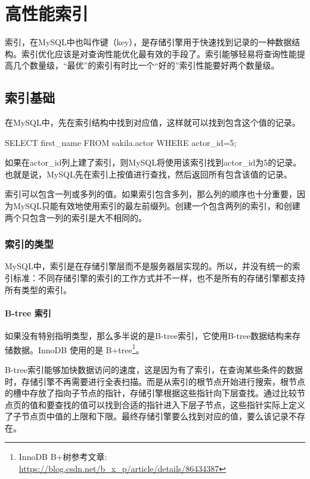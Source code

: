 \section{高性能索引}

索引，在MySQL中也叫作键（key），是存储引擎用于快速找到记录的一种数据结构。索引优化应该是对查询性能优化最有效的手段了。索引能够轻易将查询性能提高几个数量级，“最优”的索引有时比一个“好的”索引性能要好两个数量级。

\subsection{索引基础}

在MySQL中，先在索引结构中找到对应值，这样就可以找到包含这个值的记录。

\begin{sql}
SELECT first_name FROM sakila.actor WHERE actor_id=5;
\end{sql}

如果在actor\_id列上建了索引，则MySQL将使用该索引找到actor\_id为5的记录。也就是说，MySQL先在索引上按值进行查找，然后返回所有包含该值的记录。

索引可以包含一列或多列的值。如果索引包含多列，那么列的顺序也十分重要，因为MySQL只能有效地使用索引的最左前缀列。创建一个包含两列的索引，和创建两个只包含一列的索引是大不相同的。

\subsubsection{索引的类型}

MySQL中，索引是在存储引擎层而不是服务器层实现的。所以，并没有统一的索引标准：不同存储引擎的索引的工作方式并不一样，也不是所有的存储引擎都支持所有类型的索引。

\paragraph*{B-tree 索引}

如果没有特别指明类型，那么多半说的是B-tree索引，它使用B-tree数据结构来存储数据。InnoDB 使用的是 B+tree\footnote{InnoDB B+树参考文章: \url{https://blog.csdn.net/b_x_p/article/details/86434387}}。

B-tree索引能够加快数据访问的速度，这是因为有了索引，在查询某些条件的数据时，存储引擎不再需要进行全表扫描。而是从索引的根节点开始进行搜索，根节点的槽中存放了指向子节点的指针，存储引擎根据这些指针向下层查找。通过比较节点页的值和要查找的值可以找到合适的指针进入下层子节点，这些指针实际上定义了子节点页中值的上限和下限。最终存储引擎要么找到对应的值，要么该记录不存在。

